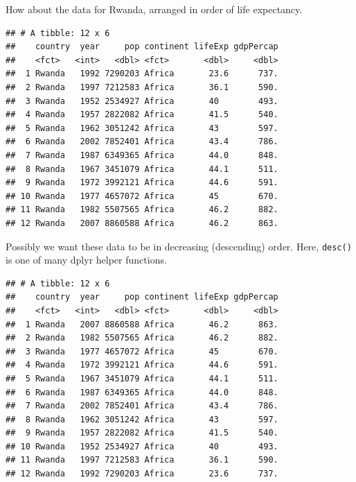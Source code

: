 \documentclass[]{article}
\newenvironment{Shaded}{\begin{snugshade}}{\end{snugshade}}
\newcommand{\KeywordTok}[1]{\textcolor[rgb]{0.13,0.29,0.53}{\textbf{#1}}}
\newcommand{\StringTok}[1]{\textcolor[rgb]{0.31,0.60,0.02}{#1}}
\newcommand{\OperatorTok}[1]{\textcolor[rgb]{0.81,0.36,0.00}{\textbf{#1}}}
\newcommand{\NormalTok}[1]{#1}
\begin{document}
How about the data for Rwanda, arranged in order of life expectancy.

\begin{Shaded}
\end{Shaded}

\begin{verbatim}
## # A tibble: 12 x 6
##    country  year     pop continent lifeExp gdpPercap
##    <fct>   <int>   <dbl> <fct>       <dbl>     <dbl>
##  1 Rwanda   1992 7290203 Africa       23.6      737.
##  2 Rwanda   1997 7212583 Africa       36.1      590.
##  3 Rwanda   1952 2534927 Africa       40        493.
##  4 Rwanda   1957 2822082 Africa       41.5      540.
##  5 Rwanda   1962 3051242 Africa       43        597.
##  6 Rwanda   2002 7852401 Africa       43.4      786.
##  7 Rwanda   1987 6349365 Africa       44.0      848.
##  8 Rwanda   1967 3451079 Africa       44.1      511.
##  9 Rwanda   1972 3992121 Africa       44.6      591.
## 10 Rwanda   1977 4657072 Africa       45        670.
## 11 Rwanda   1982 5507565 Africa       46.2      882.
## 12 Rwanda   2007 8860588 Africa       46.2      863.
\end{verbatim}

Possibly we want these data to be in decreasing (descending) order.
Here, \texttt{desc()} is one of many dplyr helper functions.

\begin{Shaded}
\end{Shaded}

\begin{verbatim}
## # A tibble: 12 x 6
##    country  year     pop continent lifeExp gdpPercap
##    <fct>   <int>   <dbl> <fct>       <dbl>     <dbl>
##  1 Rwanda   2007 8860588 Africa       46.2      863.
##  2 Rwanda   1982 5507565 Africa       46.2      882.
##  3 Rwanda   1977 4657072 Africa       45        670.
##  4 Rwanda   1972 3992121 Africa       44.6      591.
##  5 Rwanda   1967 3451079 Africa       44.1      511.
##  6 Rwanda   1987 6349365 Africa       44.0      848.
##  7 Rwanda   2002 7852401 Africa       43.4      786.
##  8 Rwanda   1962 3051242 Africa       43        597.
##  9 Rwanda   1957 2822082 Africa       41.5      540.
## 10 Rwanda   1952 2534927 Africa       40        493.
## 11 Rwanda   1997 7212583 Africa       36.1      590.
## 12 Rwanda   1992 7290203 Africa       23.6      737.
\end{verbatim}
\end{document}
